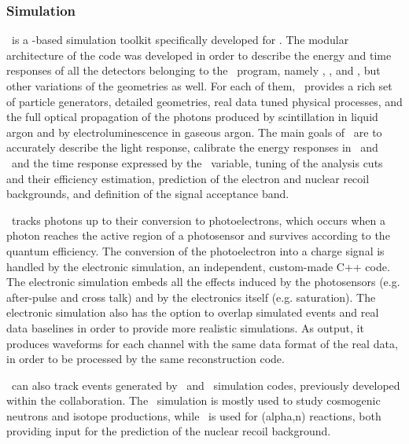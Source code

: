 \subsubsection{Simulation}
\GFDS\ is a \Geant-based simulation toolkit specifically developed for \DS. The modular architecture of the code was developed in order to describe the energy and time responses of all the detectors belonging to the \DS\ program, namely \DSts, \DSfs, and \DSks, but other variations of the geometries as well. For each of them, \GFDS\ provides a rich set of particle generators, detailed geometries, real data tuned physical processes, and the full optical propagation of the photons produced by scintillation in liquid argon and by electroluminescence in gaseous argon.  The main goals of \GFDS\ are to accurately describe the light response, calibrate the energy responses in \SOne\ and \STwo\ and the time response expressed by the \FNine\ variable, tuning of the analysis cuts and their efficiency estimation, prediction of the electron and nuclear recoil backgrounds, and definition of the signal acceptance band.  

\GFDS\ tracks photons up to their conversion to photoelectrons, which occurs when a photon reaches the active region of a photosensor and survives according to the quantum efficiency. The conversion of the photoelectron into a charge signal is handled by the electronic simulation, an independent, custom-made C++ code. The electronic simulation embeds all the effects induced by the photosensors (e.g. after-pulse and cross talk) and by the electronics itself (e.g. saturation). The electronic simulation also has the option to overlap simulated events and real data baselines in order to provide more realistic simulations.  As output, it produces waveforms for each channel with the same data format of the real data, in order to be processed by the same reconstruction code. 

\GFDS\ can also track events generated by \FLUKA\ and \TALYS\ simulation codes, previously developed within the collaboration.  The \FLUKA\ simulation is mostly used to study cosmogenic neutrons and isotope productions, while \TALYS\ is used for (alpha,n) reactions, both providing input for the prediction of the nuclear recoil background. 